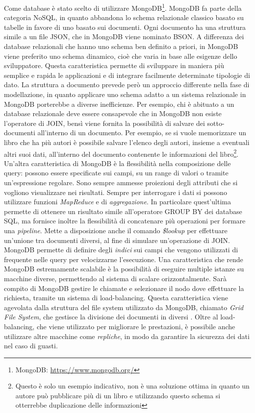 Come database è stato scelto di utilizzare MongoDB\footnote{MongoDB: \url{https://www.mongodb.org/}}. MongoDB fa parte della categoria NoSQL, in quanto abbandona lo schema relazionale classico basato su tabelle in favore di uno basato sui documenti. Ogni documento ha una struttura simile a un file JSON, che in MongoDB viene nominato BSON. A differenza dei database relazionali che hanno uno schema ben definito a priori, in MongoDB viene preferito uno schema dinamico, cioè che varia in base alle esigenze dello sviluppatore. Questa caratteristica permette di sviluppare in maniera più semplice e rapida le applicazioni e di integrare facilmente determinate tipologie di dato. La struttura a documento prevede però un approccio differente nella fase di modellazione, in quanto applicare uno schema adatto a un sistema relazionale in MongoDB porterebbe a diverse inefficienze. Per esempio, chi è abituato a un database relazionale deve essere consapevole che in MongoDB non esiste l'operatore di JOIN, bensì viene fornita la possibilità di salvare dei sotto-documenti all'interno di un documento. Per esempio, se si vuole memorizzare un libro che ha più autori è possibile salvare l'elenco degli autori, insieme a eventuali altri suoi dati, all'interno del documento contenente le informazioni del libro\footnote{Questo è solo un esempio indicativo, non è una soluzione ottima in quanto un autore può pubblicare più di un libro e utilizzando questo schema si otterrebbe duplicazione delle informazioni}. Un'altra caratteristica di MongoDB è la flessibilità nella composizione delle query: possono essere specificate sui campi, su un range di valori o tramite un'espressione regolare. Sono sempre ammesse proiezioni degli attributi che si vogliono visualizzare nei risultati. Sempre per interrogare i dati si possono utilizzare funzioni \emph{MapReduce} e di \emph{aggregazione}. In particolare quest'ultima permette di ottenere un risultato simile all'operatore GROUP BY dei database SQL, ma fornisce inoltre la flessibilità di concatenare più operazioni per formare una \emph{pipeline}. Mette a disposizione anche il comando \emph{\$lookup} per effettuare un'unione tra documenti diversi, al fine di simulare un'operazione di JOIN. MongoDB permette di definire degli \emph{indici} sui campi che vengono utilizzati di frequente nelle query per velocizzarne l'esecuzione. Una caratteristica che rende MongoDB estremamente scalabile è la possibilità di eseguire multiple istanze su macchine diverse, permettendo al sistema di scalare orizzontalmente. Sarà compito di MongoDB gestire le chiamate e selezionare il nodo dove effettuare la richiesta, tramite un sistema di load-balancing. Questa caratteristica viene agevolata dalla struttura del file system utilizzato da MongoDB, chiamato \emph{Grid File System}, che gestisce la divisione dei documenti in diversi . Oltre al load-balancing, che viene utilizzato per migliorare le prestazioni, è possibile anche utilizzare altre macchine come \emph{repliche}, in modo da garantire la sicurezza dei dati nel caso di guasti.

